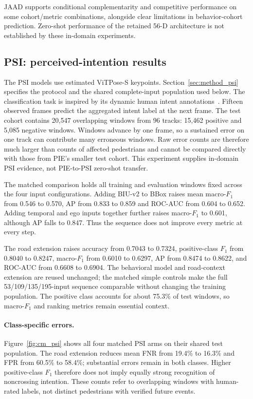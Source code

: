 JAAD supports conditional complementarity and
competitive performance on some cohort/metric combinations, alongside clear limitations
in behavior-cohort prediction. Zero-shot performance of the retained 56-D architecture
is not established by these in-domain experiments.


\FloatBarrier
\subsection{PSI: perceived-intention results}\label{sec:ch4_psi}

The PSI models use estimated ViTPose-S keypoints. Section~\ref{sec:method_psi} specifies the
protocol and the shared complete-input population used below. The classification task is inspired
by its dynamic human intent annotations~\cite{Jing2025PSI}. Fifteen observed frames
predict the aggregated intent label at the next frame. The test cohort contains 20,547 overlapping windows from
96 tracks: 15,462 positive and 5,085 negative windows. Windows advance by one frame,
so a sustained error on one track can contribute many erroneous windows. Raw error
counts are therefore much larger than counts of affected pedestrians and cannot be
compared directly with those from PIE's smaller test cohort. This experiment supplies
in-domain PSI evidence, not PIE-to-PSI zero-shot transfer.



The matched comparison holds all training and evaluation windows fixed across the four
input configurations. Adding BIU-v2 to BBox raises mean macro-$F_1$ from 0.546 to
0.570, AP from 0.833 to 0.859 and ROC-AUC from 0.604 to 0.652. Adding temporal
and ego inputs together further raises macro-$F_1$ to 0.601, although AP falls to
0.847. Thus the sequence does not improve every metric at every step.

The road extension raises accuracy from 0.7043 to 0.7324, positive-class $F_1$ from
0.8040 to 0.8247, macro-$F_1$ from 0.6010 to 0.6297, AP from 0.8474 to 0.8622,
and ROC-AUC from 0.6608 to 0.6904. The behavioral model and road-context extension are reused unchanged;
the matched simple controls make the full 53/109/135/195-input sequence comparable
without changing the training population. The positive class accounts for about
75.3\% of test windows, so macro-$F_1$ and ranking metrics remain essential context.

\paragraph{Class-specific errors.}
Figure~\ref{fig:cm_psi} shows all four matched PSI arms on their shared test population.
The road extension reduces mean FNR from 19.4\% to 16.3\% and FPR from 60.5\%
to 58.4\%; substantial errors remain in both classes. Higher positive-class $F_1$ therefore does not imply equally
strong recognition of noncrossing intention. These counts refer to overlapping
windows with human-rated labels, not distinct pedestrians with verified future events.

\FloatBarrier

